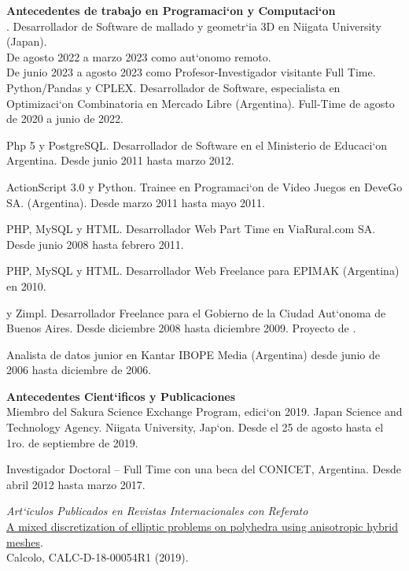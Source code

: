 \textbf{Antecedentes de trabajo en Programaci`on y Computaci`on}\\[6pt]
\Cpp. Desarrollador de Software de mallado y geometr`ia 3D en Niigata University (Japan).\\
De agosto 2022 a marzo 2023 como aut`onomo remoto.\\
De junio 2023 a agosto 2023 como Profesor-Investigador visitante Full Time.\\

Python/Pandas y CPLEX. Desarrollador de Software, especialista en
Optimizaci`on Combinatoria en Mercado Libre (Argentina). 
Full-Time de agosto de 2020 a junio de 2022.

Php 5 y PostgreSQL.  Desarrollador de Software en el
Ministerio de Educaci`on Argentina. Desde junio 2011 hasta
marzo 2012. 

ActionScript 3.0 y Python. Trainee en Programaci`on de Video Juegos en
DeveGo SA. (Argentina). Desde marzo 2011 hasta mayo 2011.

PHP, MySQL y HTML. Desarrollador Web Part Time en ViaRural.com SA. Desde junio 2008
hasta febrero 2011.

PHP, MySQL y HTML. Desarrollador Web Freelance para EPIMAK (Argentina)
en 2010. 

\Cpp y Zimpl. Desarrollador Freelance para el Gobierno de la 
Ciudad Aut`onoma de Buenos Aires. Desde diciembre 2008 hasta diciembre 2009. 
Proyecto de \href{https://github.com/alexisjawtu/ilp_auction}
{\color{blue}{un software de optimizaci`on}}. 

Analista de datos junior  en Kantar IBOPE
Media (Argentina) desde junio de 2006 hasta diciembre de 2006.

\textbf{Antecedentes Cient`ificos y Publicaciones}\\[6pt]
Miembro del Sakura Science Exchange Program, edici`on 2019. Japan Science and
Technology Agency. Niigata University, Jap`on. Desde el 25 de agosto hasta el 1ro.
de septiembre de 2019.

Investigador Doctoral  -- Full Time con una beca del CONICET,
Argentina. Desde abril 2012 hasta marzo 2017.

\emph{Art`iculos Publicados en Revistas Internacionales con Referato}\\
\href{http://em.rdcu.be/wf/click?upn=lMZy1lernSJ7apc5DgYM8RtiRnX98cgbvE81KQGn5tE-3D_-2Fq09Vpjrycd-2BAOhvYDidHaHWLaG8WMoWs1lRs2mKTzqCwYNFhlGtplH8kb8yUCOrEFESCWAEP1qrD-2BJgg09nu-2Fz61XDXWYdppeXx4JzFRLvI-2FYyjZMrov-2FaxFxLv9MaqfC-2BjYanB-2FkLIArphbTB7hvuq-2BJ-2BP0dpoVrgh2NJYizQcMbyo6AA8jcx6RYsWvb3RMk9c7QXTqmoLaHKr8Xg6yK2lC1IxrYwuPPxXUxfxXQc0WAqTO-2Bg-2F9P-2BWkhJXyogoqkg5GNjl1KqQhJV5xi014g-3D-3D}
{\color{blue}A mixed discretization of elliptic problems on polyhedra using anisotropic hybrid meshes}.\\
Calcolo, CALC-D-18-00054R1 (2019).

